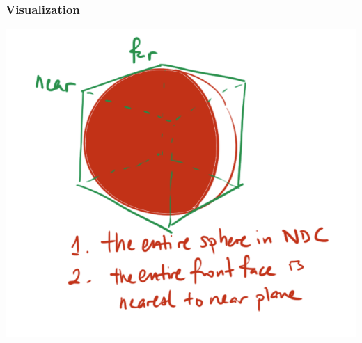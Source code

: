 \documentclass{beamer}
\begin{document}
\begin{frame}
    \frametitle{Visualization}

    \includegraphics[scale=0.5]{images/q7-vis.png}

\end{frame}

\end{document}
